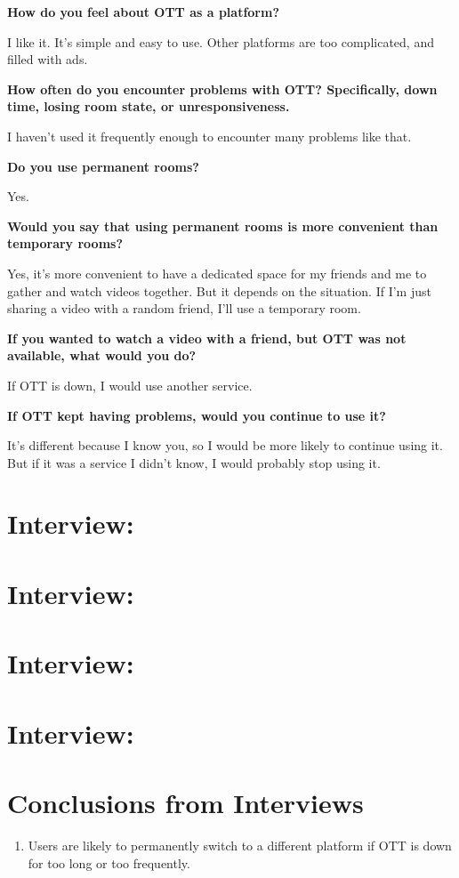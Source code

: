 \textbf{How do you feel about OTT as a platform?}

I like it. It's simple and easy to use. Other platforms are too complicated, and filled with ads.

\textbf{How often do you encounter problems with OTT? Specifically, down time, losing room state, or unresponsiveness.}

I haven't used it frequently enough to encounter many problems like that.

\textbf{Do you use permanent rooms?}

Yes.

\textbf{Would you say that using permanent rooms is more convenient than temporary rooms?}

Yes, it's more convenient to have a dedicated space for my friends and me to gather and watch videos together. But it depends on the situation. If I'm just sharing a video with a random friend, I'll use a temporary room.

\textbf{If you wanted to watch a video with a friend, but OTT was not available, what would you do?}

If OTT is down, I would use another service.

\textbf{If OTT kept having problems, would you continue to use it?}

It's different because I know you, so I would be more likely to continue using it. But if it was a service I didn't know, I would probably stop using it.

\section{Interview: }
\section{Interview: }
\section{Interview: }
\section{Interview: }

\section{Conclusions from Interviews}

\begin{enumerate}
	\item Users are likely to permanently switch to a different platform if OTT is down for too long or too frequently.
\end{enumerate}
